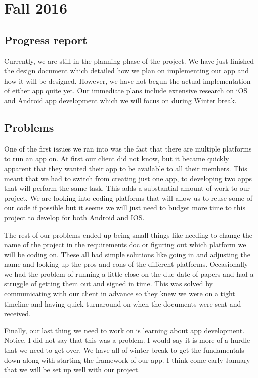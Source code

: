 \documentclass[letterpaper,10pt,draftclsnofoot,onecolumn,titlepage]{IEEEtran}
\begin{document}
\section{Fall 2016}
		\subsection{Progress report}
		Currently, we are still in the planning phase of the project.
		We have just finished the design document which detailed how we plan on implementing our app and how it will be designed.
		However, we have not begun the actual implementation of either app quite yet.
		Our immediate plans include extensive research on iOS and Android app development which we will focus on during Winter break.

		\subsection{Problems}
		One of the first issues we ran into was the fact that there are multiple platforms to run an app on.
		At first our client did not know, but it became quickly apparent that they wanted their app to be available to all their members.
		This meant that we had to switch from creating just one app, to developing two apps that will perform the same task. This adds a substantial amount of work to our project.
		We are looking into coding platforms that will allow us to reuse some of our code if possible but it seems we will just need to budget more time to this project to develop for both Android and IOS.

	The rest of our problems ended up being small things like needing to change the name of the project in the requirements doc or figuring out which platform we will be coding on.
	These all had simple solutions like going in and adjusting the name and looking up the pros and cons of the different platforms.
	Occasionally we had the problem of running a little close on the due date of papers and had a struggle of getting them out and signed in time.
	This was solved by communicating with our client in advance so they knew we were on a tight timeline and having quick turnaround on when the documents were sent and received.

	Finally, our last thing we need to work on is learning about app development.
	Notice, I did not say that this was a problem.
	I would say it is more of a hurdle that we need to get over.
	We have all of winter break to get the fundamentals down along with starting the framework of our app.
	I think come early January that we will be set up well with our project.
\end{document}
